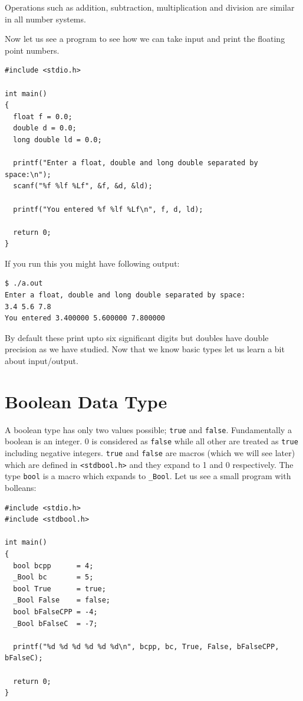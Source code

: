 Operations such as addition, subtraction, multiplication and division are
similar in all number systems.

Now let us see a program to see how we can take input and print the floating
point numbers.

\begin{verbatim}
#include <stdio.h>

int main()
{
  float f = 0.0;
  double d = 0.0;
  long double ld = 0.0;

  printf("Enter a float, double and long double separated by space:\n");
  scanf("%f %lf %Lf", &f, &d, &ld);

  printf("You entered %f %lf %Lf\n", f, d, ld);

  return 0;
}
\end{verbatim}

If you run this you might have following output:

\begin{verbatim}
$ ./a.out
Enter a float, double and long double separated by space:
3.4 5.6 7.8
You entered 3.400000 5.600000 7.800000
\end{verbatim}

By default these print upto six significant digits but doubles have double
precision as we have studied. Now that we know basic types let us learn a bit
about input/output.

\section{Boolean Data Type}
A boolean type has only two values possible; \texttt{true} and
\texttt{false}. Fundamentally a boolean is an integer. 0 is considered as
\texttt{false} while all other are treated as \texttt{true} including negative
integers. \texttt{true} and \texttt{false} are macros (which we will see later)
which are defined in \texttt{<stdbool.h>} and they expand to 1 and 0
respectively. The type \texttt{bool} is a macro which expands to
\texttt{\_Bool}. Let us see a small program with bolleans:

\begin{verbatim}
#include <stdio.h>
#include <stdbool.h>

int main()
{
  bool bcpp      = 4;
  _Bool bc       = 5;
  bool True      = true;
  _Bool False    = false;
  bool bFalseCPP = -4;
  _Bool bFalseC  = -7;

  printf("%d %d %d %d %d %d\n", bcpp, bc, True, False, bFalseCPP, bFalseC);

  return 0;
}
\end{verbatim}


